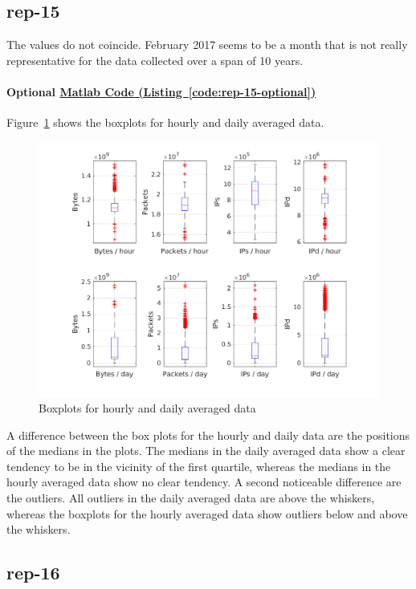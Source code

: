 \documentclass{article}
\newcommand{\codelink}[1]{%
    \hyperref[#1]{\quad\faArrowCircleRight\enskip Matlab Code (Listing~\ref{#1})}%
}
\begin{document}
\subsection{rep-15}

The values do not coincide. February 2017 seems to be a month that is not really representative for the
data collected over a span of 10 years.

\paragraph{Optional \codelink{code:rep-15-optional}}
Figure~\ref{figure:rep-15-optional} shows the boxplots for hourly and daily averaged data.

\begin{figure}[h]
    \centering
    \includegraphics[width=\textwidth]{../exercise-3/plots/rep_15_optional}
    \caption{\label{figure:rep-15-optional} Boxplots for hourly and daily averaged data}
\end{figure}

A difference between the box plots for the hourly and daily data are the positions of
the medians in the plots. The medians in the daily averaged data show a clear tendency to
be in the vicinity of the first quartile, whereas the medians in the hourly averaged data
show no clear tendency.
A second noticeable difference are the outliers. All outliers in the daily averaged data are
above the whiskers, whereas the boxplots for the hourly averaged data show outliers below and
above the whiskers.

\subsection{rep-16}
\end{document}
